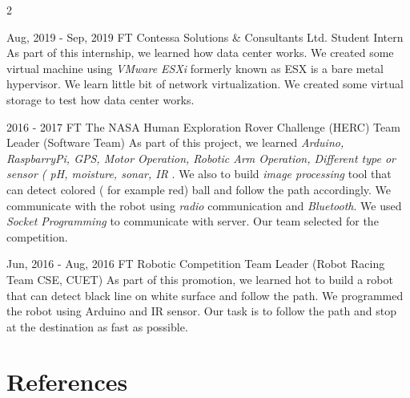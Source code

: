 \documentclass[
	10pt, %
]{RESUME}
\begin{document}
\begin{paracol}{2}

	\jobentry
	{Aug, 2019 - Sep, 2019} %
	{FT} %
	{Contessa Solutions \& Consultants Ltd.} %
	{ Student Intern } %
	{As part of this internship, we learned how data center works. We created some virtual machine using
		\textit{VMware ESXi} formerly known as ESX is a bare metal hypervisor. We learn little bit of network
		virtualization. We created some virtual storage to test how data center works.} %


	\jobentry
	{2016 - 2017} %
	{FT} %
	{The NASA Human Exploration Rover Challenge (HERC)} %
	{Team Leader (Software Team)} %
	{As part of this project, we learned \textit{Arduino, RaspbarryPi, GPS, Motor Operation, Robotic Arm
			Operation, Different type or sensor ( pH, moisture, sonar, IR }. We also to build \textit{image processing}
		tool that
		can detect colored ( for example red) ball and follow the path accordingly. We communicate with the robot
		using \textit{radio} communication and \textit{Bluetooth}. We used \textit{Socket Programming} to
		communicate with server. Our team selected for the competition.} %


	\jobentry
	{Jun, 2016 - Aug, 2016} %
	{FT} %
	{Robotic Competition} %
	{Team Leader (Robot Racing Team CSE, CUET)} %
	{As part of this promotion, we learned hot to build a robot that can detect black line on white surface
		and follow the path. We programmed the robot using Arduino and IR sensor. Our task is to follow the path
		and stop at the destination as fast as possible.} %



	\break

	\section{References}


\end{paracol}
\end{document}

